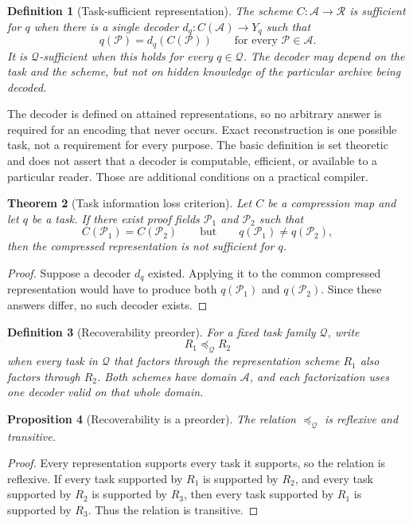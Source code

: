 \documentclass[11pt,oneside]{article}
\theoremstyle{komorebiplain}
\newtheorem{theorem}{Theorem}[section]
\newtheorem{proposition}[theorem]{Proposition}
\theoremstyle{komorebidefinition}
\newtheorem{definition}[theorem]{Definition}
\theoremstyle{komorebiremark}
\newcommand{\Pcal}{\mathcal P}
\newcommand{\Qcal}{\mathcal Q}
\begin{document}
\begin{definition}[Task-sufficient representation]
\label{res:7:2}
The scheme $C:\mathscr A\to\mathscr R$ is sufficient for $q$ when there is a single decoder $d_q:C(\mathscr A)\to Y_q$ such that
\[
q(\Pcal)=d_q(C(\Pcal))\qquad\text{for every }\Pcal\in\mathscr A.
\]
It is $\Qcal$-sufficient when this holds for every $q\in\Qcal$. The decoder may depend on the task and the scheme, but not on hidden knowledge of the particular archive being decoded.
\end{definition}

The decoder is defined on attained representations, so no arbitrary answer is required for an encoding that never occurs. Exact reconstruction is one possible task, not a requirement for every purpose. The basic definition is set theoretic and does not assert that a decoder is computable, efficient, or available to a particular reader. Those are additional conditions on a practical compiler.

\begin{theorem}[Task information loss criterion]
\label{res:7:3}
Let $C$ be a compression map and let $q$ be a task. If there exist proof fields $\Pcal_1$ and $\Pcal_2$ such that
\[
C(\Pcal_1)=C(\Pcal_2)
\qquad\text{but}\qquad
q(\Pcal_1)\ne q(\Pcal_2),
\]
then the compressed representation is not sufficient for $q$.
\end{theorem}

\begin{proof}
Suppose a decoder $d_q$ existed. Applying it to the common compressed representation would have to produce both $q(\Pcal_1)$ and $q(\Pcal_2)$. Since these answers differ, no such decoder exists.
\end{proof}

\begin{definition}[Recoverability preorder]
\label{res:7:4}
For a fixed task family $\Qcal$, write
\[
R_1\preceq_{\Qcal} R_2
\]
when every task in $\Qcal$ that factors through the representation scheme $R_1$ also factors through $R_2$. Both schemes have domain $\mathscr A$, and each factorization uses one decoder valid on that whole domain.
\end{definition}

\begin{proposition}[Recoverability is a preorder]
\label{res:7:5}
The relation $\preceq_{\Qcal}$ is reflexive and transitive.
\end{proposition}

\begin{proof}
Every representation supports every task it supports, so the relation is reflexive. If every task supported by $R_1$ is supported by $R_2$, and every task supported by $R_2$ is supported by $R_3$, then every task supported by $R_1$ is supported by $R_3$. Thus the relation is transitive.
\end{proof}
\end{document}
